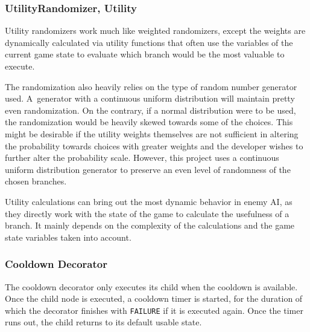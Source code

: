 

\subsubsection{UtilityRandomizer, Utility}
Utility randomizers work much like weighted randomizers, except the weights are dynamically calculated via utility functions that often use the variables of the current game state to evaluate which branch would be the most valuable to execute.

The randomization also heavily relies on the type of random number generator used. A~generator with a continuous uniform distribution will maintain pretty even randomization. On the contrary, if a normal distribution were to be used, the randomization would be heavily skewed towards some of the choices. This might be desirable if the utility weights themselves are not sufficient in altering the probability towards choices with greater weights and the developer wishes to further alter the probability scale. However, this project uses a continuous uniform distribution generator to preserve an even level of randomness of the chosen branches.

Utility calculations can bring out the most dynamic behavior in enemy AI, as they directly work with the state of the game to calculate the usefulness of a branch. It mainly depends on the complexity of the calculations and the game state variables taken into account.

\subsubsection{Cooldown Decorator}
The cooldown decorator only executes its child when the cooldown is available. Once the child node is executed, a cooldown timer is started, for the duration of which the decorator finishes with \texttt{FAILURE} if it is executed again. Once the timer runs out, the child returns to its default usable state.

